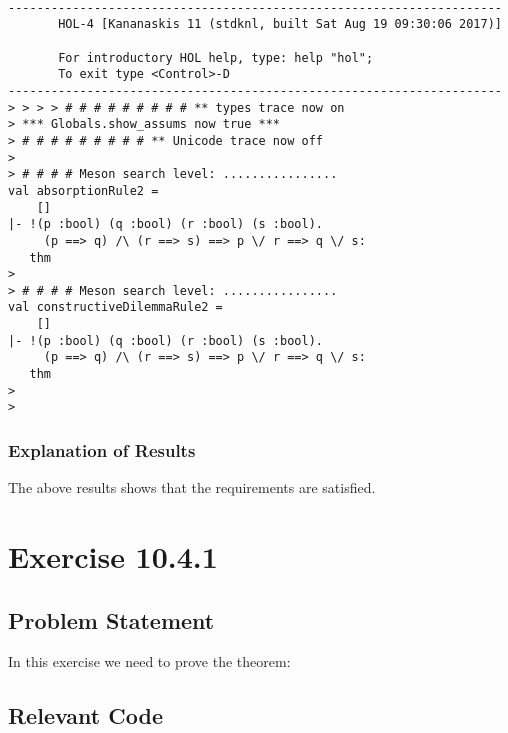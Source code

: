 \documentclass{report}
\begin{document}
\setcounter{sessioncount}{0}
\begin{session}
  \begin{scriptsize}
\begin{verbatim}

---------------------------------------------------------------------
       HOL-4 [Kananaskis 11 (stdknl, built Sat Aug 19 09:30:06 2017)]

       For introductory HOL help, type: help "hol";
       To exit type <Control>-D
---------------------------------------------------------------------
> > > > # # # # # # # # # ** types trace now on
> *** Globals.show_assums now true ***
> # # # # # # # # # ** Unicode trace now off
> 
> # # # # Meson search level: ................
val absorptionRule2 =
    []
|- !(p :bool) (q :bool) (r :bool) (s :bool).
     (p ==> q) /\ (r ==> s) ==> p \/ r ==> q \/ s:
   thm
> 
> # # # # Meson search level: ................
val constructiveDilemmaRule2 =
    []
|- !(p :bool) (q :bool) (r :bool) (s :bool).
     (p ==> q) /\ (r ==> s) ==> p \/ r ==> q \/ s:
   thm
> 
> 
\end{verbatim}
  \end{scriptsize}
\end{session}

\subsection{Explanation of Results}
\label{sec:explanation-results-3}
The above results shows that the requirements are satisfied.




 \chapter{Exercise 10.4.1}
 \label{cha:exercise-10.4.1}
  
 \section{Problem Statement}
 \label{sec:problem-statement-4}

In this exercise we need to prove the theorem:
\HOLTokenTurnstile{}  

\section{Relevant Code}
\label{sec:relevant-code-4}

\end{document}
